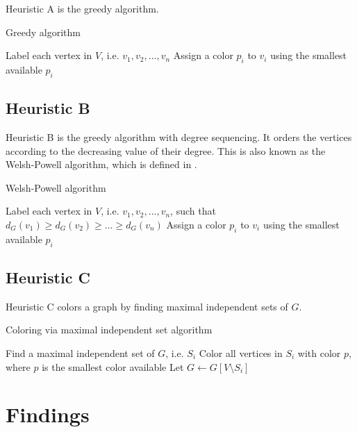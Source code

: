 \documentclass{article}
\theoremstyle{definition}
\begin{document}
Heuristic A is the greedy algorithm.

\begin{algorithm}
\caption{Greedy algorithm}
\begin{algorithmic}[1]
\State Label each vertex in $V$, i.e. $v_1, v_2, \dots, v_n$
\State Assign a color $p_i$ to $v_i$ using the smallest available $p_i$
\EndFor
\end{algorithmic}
\end{algorithm}

\subsection*{Heuristic B}

Heuristic B is the greedy algorithm with degree sequencing. It orders the vertices according to the decreasing value of their degree. This is also known as the Welsh-Powell algorithm, which is defined in \cite{welsh}.

\begin{algorithm}
\caption{Welsh-Powell algorithm}
\begin{algorithmic}[1]
\State Label each vertex in $V$, i.e. $v_1, v_2, \dots, v_n$, such that $d_G(v_1) \geq d_G(v_2) \geq \dots \geq d_G(v_n)$
\State Assign a color $p_i$ to $v_i$ using the smallest available $p_i$
\EndFor
\end{algorithmic}
\end{algorithm}

\subsection*{Heuristic C}

Heuristic C colors a graph by finding maximal independent sets of \(G\).

\begin{algorithm}
\caption{Coloring via maximal independent set algorithm}
\begin{algorithmic}[1]
\State Find a maximal independent set of $G$, i.e. $S_i$
\State Color all vertices in $S_i$ with color $p$, where $p$ is the smallest color available
\State Let $G \leftarrow G[V \setminus S_i ] $
\EndWhile
\end{algorithmic}
\end{algorithm}

\newpage

\section*{Findings}
\end{document}
